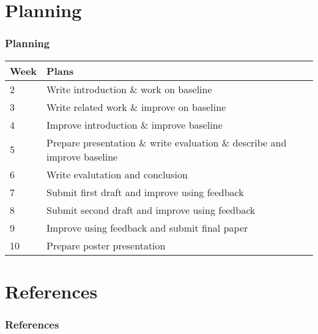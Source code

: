 \documentclass{beamer}
\begin{document}
\section{Planning}
\begin{frame}
\frametitle{Planning}
\begin{tabular}{| l | p{10cm} |}
    \hline
    Week & Plans \\ \hline
    2 & Write introduction \& work on baseline \\
    3 & Write related work \& improve on baseline \\
    4 & Improve introduction \& improve baseline \\
    5 & Prepare presentation \& write evaluation \& describe and improve baseline \\
    6 & Write evalutation and conclusion \\
    7 & Submit first draft and improve using feedback \\
    8 & Submit second draft and improve using feedback \\
    9 & Improve using feedback and submit final paper \\
    10 & Prepare poster presentation \\
    \hline
\end{tabular}
\end{frame}

\section{References}
\begin{frame}
\frametitle{References}
\printbibliography[heading=none]
\end{frame}
\end{document}
